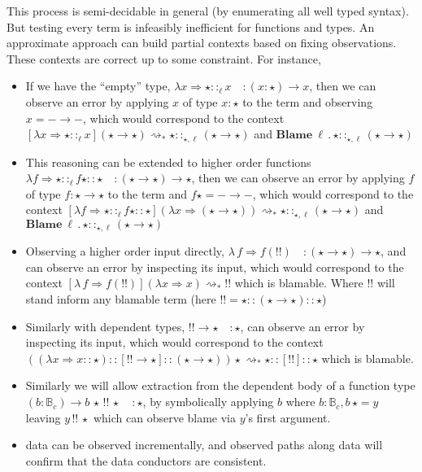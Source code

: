 This process is semi-decidable in general (by enumerating all well
typed syntax). But testing every term is infeasibly inefficient for
functions and types. An approximate approach can build partial contexts
based on fixing observations. These contexts are correct up to some
constraint. For instance, 
\begin{itemize}
\item If we have the ``empty'' type, $\lambda x\Rightarrow\star::_{\ensuremath{\ell}}x\quad:\left(x:\star\right)\rightarrow x$,
then we can observe an error by applying $x$ of type $x:\star$ to
the term and observing $x=-\rightarrow-$, which would correspond
to the context $[\lambda x\Rightarrow\star::_{\ensuremath{\ell}}x]\left(\star\rightarrow\star\right)\rightsquigarrow_{*}\star::_{\star,\ensuremath{\ell}}\left(\star\rightarrow\star\right)$
and $\textbf{Blame}\:\ensuremath{\ell}\,.\,\star::_{\star,\ensuremath{\ell}}\left(\star\rightarrow\star\right)$
\item This reasoning can be extended to higher order functions $\lambda f\Rightarrow\star::_{\ensuremath{\ell}}f\star::\star\quad:\left(\star\rightarrow\star\right)\rightarrow\star$,
then we can observe an error by applying $f$ of type $f:\star\rightarrow\star$
to the term and $f\star=-\rightarrow-$, which would correspond to
the context $[\lambda f\Rightarrow\star::_{\ensuremath{\ell}}f\star::\star]\left(\lambda x\Rightarrow\left(\star\rightarrow\star\right)\right)\rightsquigarrow_{*}\star::_{\star,\ensuremath{\ell}}\left(\star\rightarrow\star\right)$
and $\textbf{Blame}\:\ensuremath{\ell}\,.\,\star::_{\star,\ensuremath{\ell}}\left(\star\rightarrow\star\right)$
\item Observing a higher order input directly, $\lambda\,f\Rightarrow f\left(!!\right)\quad:\left(\star\rightarrow\star\right)\rightarrow\star$,
and can observe an error by inspecting its input, which would correspond
to the context $[\lambda\,f\Rightarrow f\left(!!\right)]\left(\lambda x\Rightarrow x\right)\rightsquigarrow_{*}!!$
which is blamable. Where $!!$ will stand inform any blamable term
(here $!!=\star::\left(\star\rightarrow\star\right)::\star$) 
\item Similarly with dependent types, $!!\rightarrow\star\quad:\star$,
can observe an error by inspecting its input, which would correspond
to the context $\left(\left(\lambda x\Rightarrow x::\star\right)::[!!\rightarrow\star]::\left(\star\rightarrow\star\right)\right)\star\rightsquigarrow_{*}\star::[!!]::\star$
which is blamable.
\item Similarly we will allow extraction from the dependent body of a function
type $\left(b:\mathbb{B}_{c}\right)\rightarrow b\,\star\,!!\,\star\quad:\star$,
by symbolically applying $b$ where $b:\mathbb{B}_{c},b\,\star=y$
leaving $y\,!!\,\star$ which can observe blame via $y$'s first argument. 
\item data can be observed incrementally, and observed paths along data
will confirm that the data conductors are consistent.
\end{itemize}
